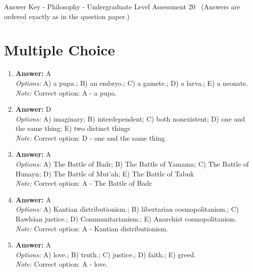 \documentclass[12pt]{article}
\begin{document}
\begin{center}
Answer Key - Philosophy - Undergraduate Level Assessment 20 \
\small (Answers are ordered exactly as in the question paper.)
\end{center}

\section*{Multiple Choice}
\begin{enumerate}[label=\arabic*.]
\item \textbf{Answer:} A
\\ \textit{Options:} A) a pupa.; B) an embryo.; C) a gamete.; D) a larva.; E) a neonate.
\\ \textit{Note:} Correct option: A - a pupa.
\item \textbf{Answer:} D
\\ \textit{Options:} A) imaginary; B) interdependent; C) both nonexistent; D) one and the same thing; E) two distinct things
\\ \textit{Note:} Correct option: D - one and the same thing
\item \textbf{Answer:} A
\\ \textit{Options:} A) The Battle of Badr; B) The Battle of Yamama; C) The Battle of Hunayn; D) The Battle of Mut'ah; E) The Battle of Tabuk
\\ \textit{Note:} Correct option: A - The Battle of Badr
\item \textbf{Answer:} A
\\ \textit{Options:} A) Kantian distributionism.; B) libertarian cosmopolitanism.; C) Rawlsian justice.; D) Communitarianism.; E) Anarchist cosmopolitanism.
\\ \textit{Note:} Correct option: A - Kantian distributionism.
\item \textbf{Answer:} A
\\ \textit{Options:} A) love.; B) truth.; C) justice.; D) faith.; E) greed.
\\ \textit{Note:} Correct option: A - love.
\end{enumerate}
\end{document}
